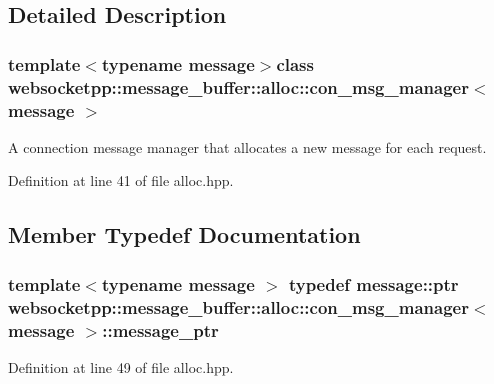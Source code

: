 \subsection{Detailed Description}
\subsubsection*{template$<$typename message$>$class websocketpp\+::message\+\_\+buffer\+::alloc\+::con\+\_\+msg\+\_\+manager$<$ message $>$}

A connection message manager that allocates a new message for each request. 

Definition at line 41 of file alloc.\+hpp.



\subsection{Member Typedef Documentation}
\hypertarget{classwebsocketpp_1_1message__buffer_1_1alloc_1_1con__msg__manager_a2b7d97fc21ff99e307ec20fe0369f294}{}
\subsubsection[{message\+\_\+ptr}]{\setlength{\rightskip}{0pt plus 5cm}template$<$typename message $>$ typedef {\bf message\+::ptr} {\bf websocketpp\+::message\+\_\+buffer\+::alloc\+::con\+\_\+msg\+\_\+manager}$<$ {\bf message} $>$\+::{\bf message\+\_\+ptr}}\label{classwebsocketpp_1_1message__buffer_1_1alloc_1_1con__msg__manager_a2b7d97fc21ff99e307ec20fe0369f294}


Definition at line 49 of file alloc.\+hpp.

\hypertarget{classwebsocketpp_1_1message__buffer_1_1alloc_1_1con__msg__manager_a2b7d97fc21ff99e307ec20fe0369f294}{}

